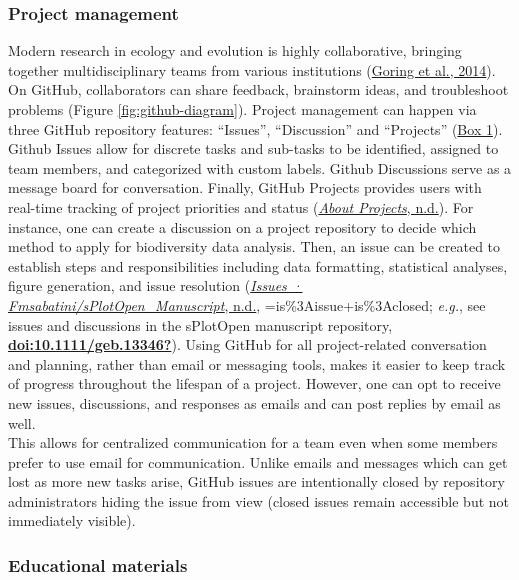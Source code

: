 \hypertarget{project-management}{%
\subsubsection{Project management}\label{project-management}}

Modern research in ecology and evolution is highly collaborative, bringing together multidisciplinary teams from various institutions (\protect\hyperlink{ref-1HhzKAC1K}{Goring et al., 2014}).
On GitHub, collaborators can share feedback, brainstorm ideas, and troubleshoot problems (Figure \ref{fig:github-diagram}).
Project management can happen via three GitHub repository features: ``Issues'', ``Discussion'' and ``Projects'' (\protect\hyperlink{definitions}{Box 1}).
Github Issues allow for discrete tasks and sub-tasks to be identified, assigned to team members, and categorized with custom labels.
Github Discussions serve as a message board for conversation.
Finally, GitHub Projects provides users with real-time tracking of project priorities and status (\protect\hyperlink{ref-RhBKe0MG}{\emph{About Projects}, n.d.}).
For instance, one can create a discussion on a project repository to decide which method to apply for biodiversity data analysis.
Then, an issue can be created to establish steps and responsibilities including data formatting, statistical analyses, figure generation, and issue resolution (\protect\hyperlink{ref-3UAritXO}{\emph{Issues · Fmsabatini/sPlotOpen\_Manuscript}, n.d.}, =is\%3Aissue+is\%3Aclosed; \emph{e.g.}, see issues and discussions in the sPlotOpen manuscript repository, \protect\hyperlink{ref-doi:10.1111ux2fgeb.13346}{\textbf{doi:10.1111/geb.13346?}}).
Using GitHub for all project-related conversation and planning, rather than email or messaging tools, makes it easier to keep track of progress throughout the lifespan of a project.
However, one can opt to receive new issues, discussions, and responses as emails and can post replies by email as well.\\
This allows for centralized communication for a team even when some members prefer to use email for communication.
Unlike emails and messages which can get lost as more new tasks arise, GitHub issues are intentionally closed by repository administrators hiding the issue from view (closed issues remain accessible but not immediately visible).

\hypertarget{educational-materials}{%
\subsubsection{Educational materials}\label{educational-materials}}

